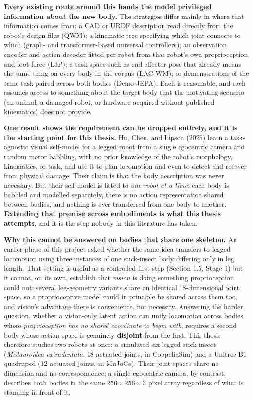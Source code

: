 \documentclass[12pt,a4paper,oneside]{report}
\begin{document}
\textbf{Every existing route around this hands the model privileged information about the new body.} The
strategies differ mainly in where that information comes from: a CAD or URDF description read directly from the
robot's design files (QWM); a kinematic tree specifying which joint connects to which (graph- and
transformer-based universal controllers); an observation encoder and action decoder fitted per robot from that
robot's own proprioception and foot force (L3P); a task space such as end-effector pose that already means the
same thing on every body in the corpus (LAC-WM); or demonstrations of the same task paired across both bodies
(Demo-JEPA). Each is reasonable, and each assumes access to something about the target body that the motivating
scenario (an animal, a damaged robot, or hardware acquired without published kinematics) does not provide.

\textbf{One result shows the requirement can be dropped entirely, and it is the starting point for this thesis.}
Hu, Chen, and Lipson (2025) learn a task-agnostic visual self-model for a legged robot from a single egocentric
camera and random motor babbling, with no prior knowledge of the robot's morphology, kinematics, or task, and use
it to plan locomotion and even to detect and recover from physical damage. Their claim is that the body
description was never necessary. But their self-model is fitted to \emph{one robot at a time}: each body is
babbled and modelled separately, there is no action representation shared between bodies, and nothing is ever
transferred from one body to another. \textbf{Extending that premise across embodiments is what this thesis
attempts}, and it is the step nobody in this literature has taken.

\textbf{Why this cannot be answered on bodies that share one skeleton.} An earlier phase of this project asked
whether the same idea transfers to legged locomotion using three instances of one stick-insect body differing only
in leg length. That setting is useful as a controlled first step (Section 1.5, Stage 1) but it cannot, on its own,
establish that \emph{vision} is doing something proprioception could not: several leg-geometry variants share an identical
18-dimensional joint space, so a proprioceptive model could in principle be shared across them too, and vision's
advantage there is convenience, not necessity. Answering the harder question, whether a vision-only latent action
can unify locomotion across bodies where \emph{proprioception has no shared coordinate to begin with}, requires a
second body whose action space is genuinely \textbf{disjoint} from the first. This thesis therefore studies two
robots at once: a simulated six-legged stick insect (\emph{Medauroidea extradentata}, 18 actuated joints, in
CoppeliaSim) and a Unitree B1 quadruped (12 actuated joints, in MuJoCo). Their joint spaces share no dimension and
no correspondence; a single egocentric camera, by contrast, describes both bodies in the same
$256\times256\times3$ pixel array regardless of what is standing in front of it.
\end{document}
